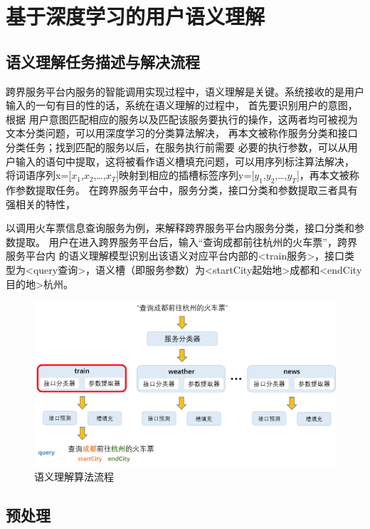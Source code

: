 \chapter{基于深度学习的用户语义理解}

\section{语义理解任务描述与解决流程}
跨界服务平台内服务的智能调用实现过程中，语义理解是关键。系统接收的是用户输入的一句有目的性的话，系统在语义理解的过程中，
首先要识别用户的意图，根据
用户意图匹配相应的服务以及匹配该服务要执行的操作，这两者均可被视为文本分类问题，可以用深度学习的分类算法解决，
再本文被称作服务分类和接口分类任务；找到匹配的服务以后，在服务执行前需要
必要的执行参数，可以从用户输入的语句中提取，这将被看作语义槽填充问题，可以用序列标注算法解决，
将词语序列x=[$x_{1}$,$x_{2}$,\dots,$x_{T}$]映射到相应的插槽标签序列y=[$y_{1}$,$y_{2}$,\dots,$y_{T}$]，再本文被称作参数提取任务。
在跨界服务平台中，服务分类，接口分类和参数提取三者具有强相关的特性，

以调用火车票信息查询服务为例，来解释跨界服务平台内服务分类，接口分类和参数提取。
用户在进入跨界服务平台后，输入“查询成都前往杭州的火车票”，跨界服务平台内
的语义理解模型识别出该语义对应平台内部的<train服务>，接口类型为<query查询>，语义槽（即服务参数）为<startCity起始地>成都和<endCity目的地>杭州。


\begin{figure}[htbp]
    \centering
    \includegraphics[scale=0.5]{./images/liucheng.png}
    \caption{语义理解算法流程}
    \label{fig:questiondesc}
  \end{figure}


\section{预处理}
